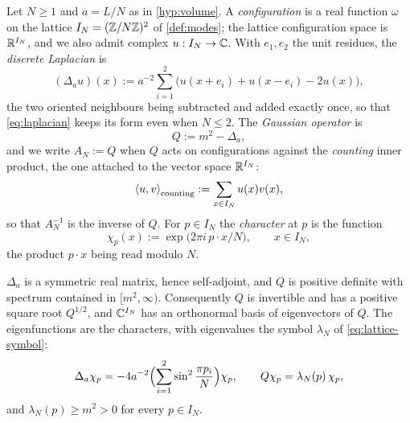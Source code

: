 \begin{definition}\label{def:lattice-laplacian}
Let $N\ge1$ and $a=L/N$ as in \cref{hyp:volume}. A \emph{configuration} is a real function $\omega$ on the
lattice $I_N=(\mathbb{Z}/N\mathbb{Z})^2$ of \cref{def:modes}; the lattice configuration space is $\mathbb{R}^{I_N}$, and we also
admit complex $u:I_N\to\mathbb{C}$. With $e_1,e_2$ the unit residues, the \emph{discrete Laplacian} is
\begin{equation}\label{eq:laplacian}
  (\Delta_au)(x):=a^{-2}\sum_{i=1}^{2}\bigl(u(x+e_i)+u(x-e_i)-2u(x)\bigr),
\end{equation}
the two oriented neighbours being subtracted and added exactly once, so that \eqref{eq:laplacian} keeps
its form even when $N\le2$. The \emph{Gaussian operator} is
\begin{equation}\label{eq:gaussian-operator}
  Q:=m^2-\Delta_a ,
\end{equation}
and we write $A_N:=Q$ when $Q$ acts on configurations against the \emph{counting} inner product, the one
attached to the vector space $\mathbb{R}^{I_N}$:
\begin{equation}\label{eq:counting-inner-product}
  \left\langle u, v \right\rangle_{\mathrm{counting}}:=\sum_{x\in I_N}u(x)v(x),
\end{equation}
so that $A_N^{-1}$ is the inverse of $Q$. For $p\in I_N$ the \emph{character} at $p$ is the function
\[
  \chi_p(x):=\exp\bigl(2\pi i\,p\cdot x/N\bigr),\qquad x\in I_N ,
\]
the product $p\cdot x$ being read modulo $N$.
\end{definition}

\begin{proposition}\label{prop:operator}
$\Delta_a$ is a symmetric real matrix, hence self-adjoint, and $Q$ is positive definite with spectrum
contained in $[m^2,\infty)$. Consequently $Q$ is invertible and has a positive square root $Q^{1/2}$, and
$\mathbb{C}^{I_N}$ has an orthonormal basis of eigenvectors of $Q$. The eigenfunctions are the characters, with
eigenvalues the symbol $\lambda_N$ of \eqref{eq:lattice-symbol}:
\begin{equation}\label{eq:eigen-identity}
  \Delta_a\chi_p=-4a^{-2}\Bigl(\sum_{i=1}^{2}\sin^2\frac{\pi p_i}{N}\Bigr)\chi_p ,
  \qquad
  Q\chi_p=\lambda_N(p)\,\chi_p ,
\end{equation}
and $\lambda_N(p)\ge m^2>0$ for every $p\in I_N$.
\end{proposition}

